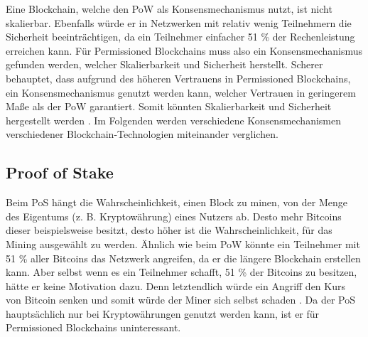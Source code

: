 Eine Blockchain, welche den \acs{PoW} als Konsensmechanismus nutzt, ist nicht skalierbar. Ebenfalls würde er in Netzwerken mit relativ wenig Teilnehmern die Sicherheit beeinträchtigen, da ein Teilnehmer einfacher 51 \% der Rechenleistung erreichen kann. Für Permissioned Blockchains muss also ein Konsensmechanismus gefunden werden, welcher Skalierbarkeit und Sicherheit herstellt. Scherer behauptet, dass aufgrund des höheren Vertrauens in Permissioned Blockchains, ein Konsensmechanismus genutzt werden kann, welcher Vertrauen in geringerem Maße als der \acs{PoW} garantiert. Somit könnten Skalierbarkeit und Sicherheit hergestellt werden \cite{SchererPerformanceScalabilityBlockchain2017}. Im Folgenden werden verschiedene Konsensmechanismen verschiedener Blockchain-Technologien miteinander verglichen.

\subsection{Proof of Stake}
Beim PoS hängt die Wahrscheinlichkeit, einen Block zu minen, von der Menge des Eigentums (z. B. Kryptowährung) eines Nutzers ab. Desto mehr Bitcoins dieser beispielsweise besitzt, desto höher ist die Wahrscheinlichkeit, für das Mining ausgewählt zu werden. Ähnlich wie beim \acs{PoW} könnte ein Teilnehmer mit 51 \% aller Bitcoins das Netzwerk angreifen, da er die längere Blockchain erstellen kann. Aber selbst wenn es ein Teilnehmer schafft, 51 \% der Bitcoins zu besitzen, hätte er keine Motivation dazu. Denn letztendlich würde ein Angriff den Kurs von Bitcoin senken und somit würde der Miner sich selbst schaden \cite{ZhengBlockchainChallengesOpportunities2017}. Da der PoS hauptsächlich nur bei Kryptowährungen genutzt werden kann, ist er für Permissioned Blockchains uninteressant.

